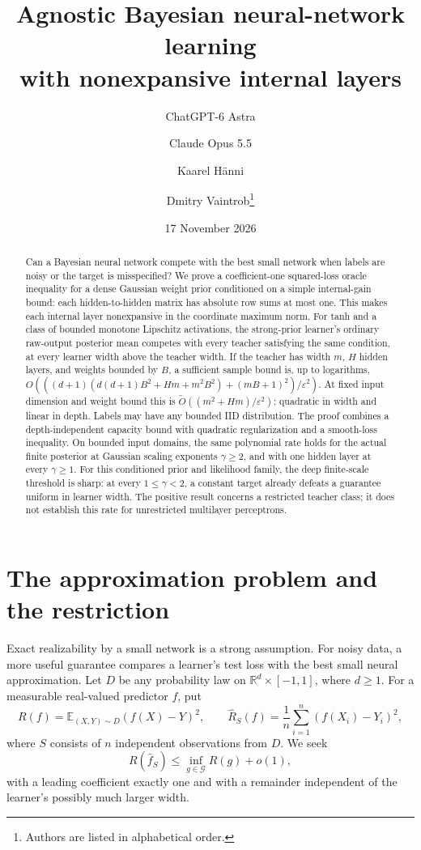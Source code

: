 \documentclass[11pt]{article}
\title{Agnostic Bayesian neural-network learning\\with nonexpansive internal layers}
\author{ChatGPT-6 Astra \and Claude Opus 5.5 \and Kaarel H\"anni \and
Dmitry Vaintrob\thanks{Authors are listed in alphabetical order.}}
\date{17 November 2026}
\theoremstyle{definition}\newtheorem{definition}[theorem]{Definition}
\theoremstyle{remark}\newtheorem{remark}[theorem]{Remark}
\newcommand{\R}{\mathbb R}\newcommand{\E}{\mathbb E}
\begin{document}
\maketitle
\begin{abstract}
Can a Bayesian neural network compete with the best small network when labels are noisy or the target is misspecified? We prove a coefficient-one squared-loss oracle inequality for a dense Gaussian weight prior conditioned on a simple internal-gain bound: each hidden-to-hidden matrix has absolute row sums at most one. This makes each internal layer nonexpansive in the coordinate maximum norm. For tanh and a class of bounded monotone Lipschitz activations, the strong-prior learner's ordinary raw-output posterior mean competes with every teacher satisfying the same condition, at every learner width above the teacher width. If the teacher has width $m$, $H$ hidden layers, and weights bounded by $B$, a sufficient sample bound is, up to logarithms,
$O(((d+1)(d(d+1)B^2+Hm+m^2B^2)+(mB+1)^2)/\varepsilon^2)$.
At fixed input dimension and weight bound this is $\widetilde O((m^2+Hm)/\varepsilon^2)$: quadratic in width and linear in depth. Labels may have any bounded IID distribution. The proof combines a depth-independent capacity bound with quadratic regularization and a smooth-loss inequality. On bounded input domains, the same polynomial rate holds for the actual finite posterior at Gaussian scaling exponents $\gamma\geq2$, and with one hidden layer at every $\gamma\geq1$. For this conditioned prior and likelihood family, the deep finite-scale threshold is sharp: at every $1\leq\gamma<2$, a constant target already defeats a guarantee uniform in learner width. The positive result concerns a restricted teacher class; it does not establish this rate for unrestricted multilayer perceptrons.
\end{abstract}

\section{The approximation problem and the restriction}

Exact realizability by a small network is a strong assumption. For noisy data, a more useful guarantee compares a learner's test loss with the best small neural approximation. Let $D$ be any probability law on $\R^d\times[-1,1]$, where $d\geq1$. For a measurable real-valued predictor $f$, put
\[
 R(f)=\E_{(X,Y)\sim D}(f(X)-Y)^2,
 \qquad
 \widehat R_S(f)=\frac1n\sum_{i=1}^n(f(X_i)-Y_i)^2,
\]
where $S$ consists of $n$ independent observations from $D$. We seek
\[
 R(\widehat f_S)\leq \inf_{g\in\mathcal G}R(g)+o(1),
\]
with a leading coefficient exactly one and with a remainder independent of the learner's possibly much larger width.
\end{document}
